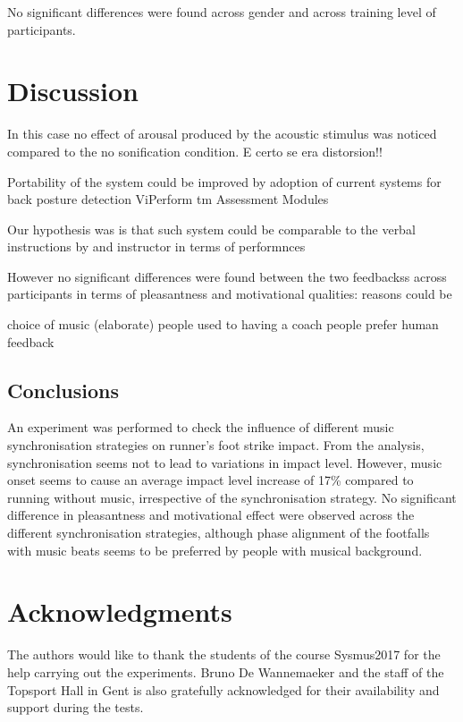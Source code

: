 \documentclass[10pt,letterpaper]{article}
\begin{document}
No significant differences were found across gender and across training level of participants. 

\section*{Discussion} \label{sec:discussion}

In this case no effect of arousal produced by the acoustic stimulus was noticed compared to the no sonification condition. E certo se era distorsion!!




Portability of the system could be improved by adoption of current systems for back posture detection ViPerform tm Assessment Modules


Our hypothesis was is that such system could be comparable to the verbal instructions by and instructor in terms of performnces 

However no significant differences were found between the two feedbackss across participants in terms of pleasantness and motivational qualities: reasons could be

choice of music (elaborate)
people used to having a coach
people prefer human feedback







\subsection*{Conclusions}

An experiment was performed to check the influence of different music synchronisation strategies on runner's foot strike impact. From the analysis, synchronisation seems not to lead to variations in impact level. However, music onset seems to cause an average impact level increase of 17\% compared to running without music, irrespective of the synchronisation strategy.
No significant difference in pleasantness and motivational effect were observed across the different synchronisation strategies, although phase alignment of the footfalls with music beats seems to be preferred by people with musical background. 



\section*{Acknowledgments}
The authors would like to thank the students of the course Sysmus2017 for the help carrying out the experiments. Bruno De Wannemaeker and the staff of the Topsport Hall in Gent is also gratefully acknowledged for their availability and support during the tests.
\nolinenumbers
\end{document}
